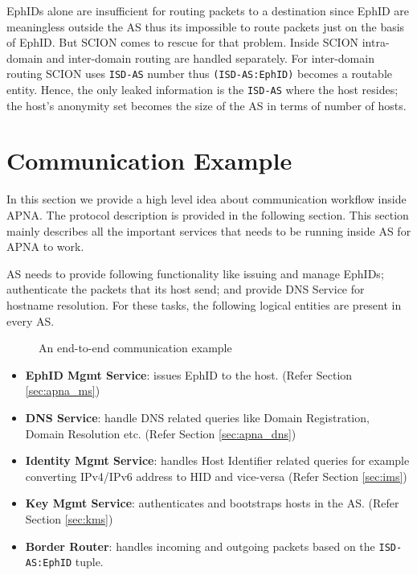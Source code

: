 EphIDs alone are insufficient for routing packets to a destination since EphID are meaningless outside the AS thus its impossible to route packets just on the basis of EphID. But SCION comes to rescue for that problem. Inside SCION intra-domain and inter-domain routing are handled separately. For inter-domain routing SCION uses \texttt{ISD-AS} number thus \texttt{(ISD-AS:EphID)} becomes a routable entity. Hence, the only leaked information is the \texttt{ISD-AS} where the host resides; the host's anonymity set becomes the size of the AS in terms of number of hosts.

\section{Communication Example} \label{sec:comm}
In this section we provide a high level idea about communication workflow inside APNA. The protocol description is provided in the following section. This section mainly describes all the important services that needs to be running inside AS for APNA to work.

AS needs to provide following functionality like issuing and manage EphIDs; authenticate the packets that its host send; and provide DNS Service for hostname resolution. For these tasks, the following logical entities are present in every AS.

\begin{figure}[th!!]
\centering
\noindent
{}
\decoRule
\caption[APNA End-to-end communication]{An end-to-end communication example}
\label{fig:end_to_end_comm_apna}
\end{figure}

\begin{itemize}
    \item \textbf{EphID Mgmt Service}: issues EphID to the host. (Refer Section \ref{sec:apna_ms})
    \item \textbf{DNS Service}: handle DNS related queries like Domain Registration, Domain Resolution etc. (Refer Section \ref{sec:apna_dns})
    \item \textbf{Identity Mgmt Service}: handles Host Identifier related queries for example converting IPv4/IPv6 address to HID and vice-versa (Refer Section \ref{sec:ims})
    \item \textbf{Key Mgmt Service}: authenticates and bootstraps hosts in the AS. (Refer Section \ref{sec:kms})
    \item \textbf{Border Router}: handles incoming and outgoing packets based on the \texttt{ISD-AS:EphID} tuple.
\end{itemize}

